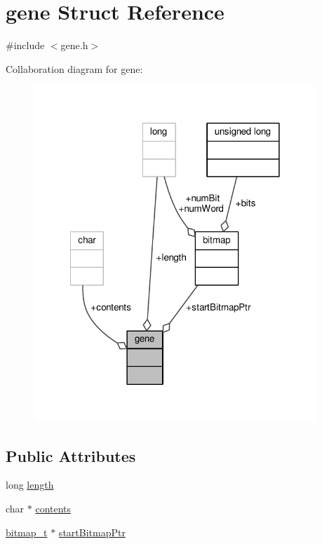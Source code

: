 \hypertarget{structgene}{\section{gene Struct Reference}
\label{structgene}
}


{\ttfamily \#include $<$gene.\-h$>$}



Collaboration diagram for gene\-:
\nopagebreak
\begin{figure}[H]
\begin{center}
\leavevmode
\includegraphics[width=302pt]{structgene__coll__graph}
\end{center}
\end{figure}
\subsection*{Public Attributes}
\begin{DoxyCompactItemize}
\item 
long \hyperlink{structgene_aeacdab4421294968ba252d081bf3a664}{length}
\item 
char $\ast$ \hyperlink{structgene_a26fc54cc0fb18bd13a224954752b5a64}{contents}
\item 
\hyperlink{bitmap_8h_ab8cbe0b7e8894a92ab1c7b17acebcc83}{bitmap\-\_\-t} $\ast$ \hyperlink{structgene_a2bccf5433760bcb411a5b223457115ce}{start\-Bitmap\-Ptr}
\end{DoxyCompactItemize}


